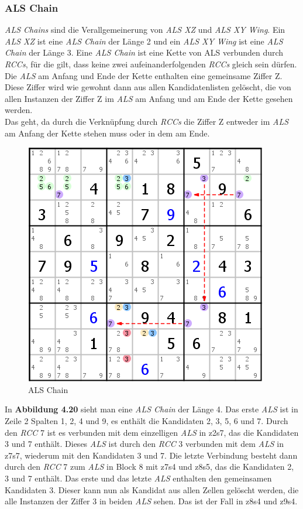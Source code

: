 \newpage
\subsubsection{ALS Chain}
\textit{ALS Chains} sind die Verallgemeinerung von \textit{ALS XZ} und \textit{ALS XY Wing}. Ein \textit{ALS XZ} ist eine \textit{ALS Chain} der Länge 2 und ein \textit{ALS XY Wing} ist eine \textit{ALS Chain} der Länge 3. Eine \textit{ALS Chain} ist eine Kette von {ALS} verbunden durch \textit{RCCs}, für die gilt, dass keine zwei aufeinanderfolgenden \textit{RCCs} gleich sein dürfen. Die \textit{ALS} am Anfang und Ende der Kette enthalten eine gemeinsame Ziffer Z. Diese Ziffer wird wie gewohnt dann aus allen Kandidatenlisten gelöscht, die von allen Instanzen der Ziffer Z im \textit{ALS} am Anfang und am Ende der Kette gesehen werden.\\
Das geht, da durch die Verknüpfung durch \textit{RCCs} die Ziffer Z entweder im \textit{ALS} am Anfang der Kette stehen muss oder in dem am Ende.

\begin{figure}[h]
\begin{center}
\includegraphics{./img/ALS_Chain.png}
\caption{ALS Chain}
\end{center}
\end{figure}

In \textbf{Abbildung 4.20} sieht man eine \textit{ALS Chain} der Länge 4. Das erste \textit{ALS} ist in Zeile 2 Spalten 1, 2, 4 und 9, es enthält die Kandidaten 2, 3, 5, 6 und 7. Durch den \textit{RCC} 7 ist es verbunden mit dem einzelligen \textit{ALS} in z2s7, das die Kandidaten 3 und 7 enthält. Dieses \textit{ALS} ist durch den \textit{RCC} 3 verbunden mit dem \textit{ALS} in z7s7, wiederum mit den Kandidaten 3 und 7. Die letzte Verbindung besteht dann durch den \textit{RCC} 7 zum \textit{ALS} in Block 8 mit z7s4 und z8s5, das die Kandidaten 2, 3 und 7 enthält. Das erste und das letzte \textit{ALS} enthalten den gemeinsamen Kandidaten 3. Dieser kann nun als Kandidat aus allen Zellen gelöscht werden, die alle Instanzen der Ziffer 3 in beiden \textit{ALS} sehen. Das ist der Fall in z8s4 und z9s4.